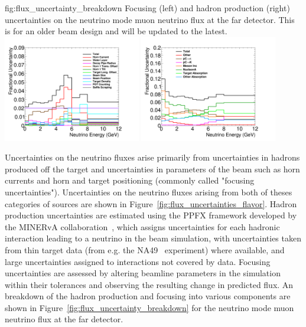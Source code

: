 \begin{dunefigure}{fig:flux_uncertainty_breakdown}
{Focusing (left) and hadron production (right) uncertainties on the neutrino mode muon neutrino flux at the far detector.  This is for an older beam design and will be updated to the latest.  }
\includegraphics[width=0.45\textwidth]{graphics/focusing_error_overlay_numu_neutrino_FD_opt.png}
    \includegraphics[width=0.45\textwidth]{graphics/HP_error_overlay_numu_neutrino_FD_opt.png}\end{dunefigure}

Uncertainties on the neutrino fluxes arise primarily from uncertainties in hadrons produced off the target and uncertainties in parameters of the beam such as horn currents and horn and target positioning (commonly called "focusing uncertainties").  Uncertainties on the neutrino fluxes arising from both of theses categories of sources are shown in Figure~\ref{fig:flux_uncertainties_flavor}.  Hadron production uncertainties are estimated using the PPFX framework developed by the MINERvA collaboration~\cite{Aliaga:2016oaz, AliagaSoplin:2016shs}, which assigns uncertainties for each hadronic interaction leading to a neutrino in the beam simulation, with uncertainties taken from thin target data (from e.g. the NA49~\cite{NA49} experiment) where available, and large uncertainties assigned to interactions not covered by data.  Focusing uncertainties are assessed by altering beamline parameters in the simulation within their tolerances and observing the resulting change in predicted flux.  An breakdown of the hadron production and focusing into various components are shown in Figure~\ref{fig:flux_uncertainty_breakdown} for the neutrino mode muon neutrino flux at the far detector.    


